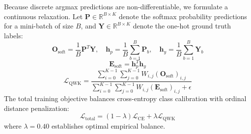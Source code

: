 \documentclass[conference]{IEEEtran}
\begin{document}
Because discrete argmax predictions are non-differentiable, we formulate a continuous relaxation. Let $\mathbf{P} \in \mathbb{R}^{B \times K}$ denote the softmax probability predictions for a mini-batch of size $B$, and $\mathbf{Y} \in \mathbb{R}^{B \times K}$ denote the one-hot ground truth labels:
\begin{equation}
    \mathbf{O}_{\text{soft}} = \frac{1}{B} \mathbf{P}^T \mathbf{Y}, \quad \mathbf{h}_p = \frac{1}{B} \sum_{b=1}^B \mathbf{P}_b, \quad \mathbf{h}_y = \frac{1}{B} \sum_{b=1}^B \mathbf{Y}_b
\end{equation}
\begin{equation}
    \mathbf{E}_{\text{soft}} = \mathbf{h}_p^T \mathbf{h}_y
\end{equation}
\begin{equation}
    \mathcal{L}_{\text{QWK}} = \frac{\sum_{i=0}^{K-1} \sum_{j=0}^{K-1} W_{i, j} (\mathbf{O}_{\text{soft}})_{i, j}}{\sum_{i=0}^{K-1} \sum_{j=0}^{K-1} W_{i, j} (\mathbf{E}_{\text{soft}})_{i, j} + \epsilon}
\end{equation}
The total training objective balances cross-entropy class calibration with ordinal distance penalization:
\begin{equation}
    \mathcal{L}_{\text{total}} = (1 - \lambda) \mathcal{L}_{\text{CE}} + \lambda \mathcal{L}_{\text{QWK}}
\end{equation}
where $\lambda = 0.40$ establishes optimal empirical balance.
\end{document}
